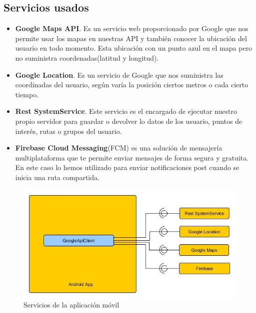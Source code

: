 \subsection{Servicios usados}
\begin{itemize}
\item \textbf{Google Maps API}. Es un servicio web proporcionado por Google que nos permite usar los mapas en nuestras API y también conocer la ubicación del usuario  en todo momento. Esta ubicación  con un punto azul en el mapa pero no suministra coordenadas(latitud y longitud).
\item \textbf{Google Location}. Es un servicio de Google que nos suministra las coordinadas del usuario, según varía la posición ciertos metros o cada cierto tiempo.
\item \textbf{Rest SystemService}. Este servicio es el encargado de ejecutar nuestro propio servidor para guardar o devolver lo datos de los usuario, puntos de interés, rutas o grupos del usuario.
\item \textbf{Firebase Cloud Messaging}(FCM) es una solución de mensajería multiplataforma que te permite enviar mensajes de forma segura y gratuita. En este caso lo hemos utilizado para enviar notificaciones post cuando se inicia una ruta compartida.
\end{itemize}
\begin{figure}[H]
		\centering
		\includegraphics[width=\textwidth] {arquitectura-movil.jpg}
		\caption{Servicios de la aplicación móvil }
		\label{fig:arquitectura-movil}
	\end{figure}
	
	

